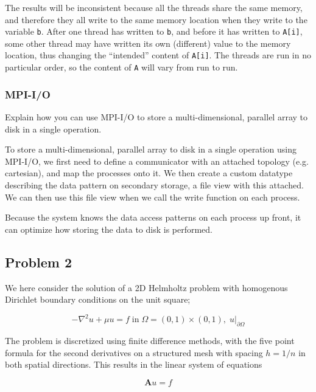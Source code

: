 The results will be inconsistent because all the threads share the same memory, and therefore they all write to the same memory location when they write to the variable \texttt{b}. After one thread has written to \texttt{b}, and before it has written to \texttt{A[i]}, some other thread may have written its own (different) value to the memory location, thus changing the ``intended'' content of \texttt{A[i]}. The threads are run in no particular order, so the content of \texttt{A}  will vary from run to run.

\subsubsection{MPI-I/O} %
\label{ssub:mpi_i_o}

\begin{question}
  Explain how you can use MPI-I/O to store a multi-dimensional, parallel array to disk in a single operation.
\end{question}

To store a multi-dimensional, parallel array to disk in a single operation using MPI-I/O, we first need to define a communicator with an attached topology (e.g. cartesian), and map the processes onto it. We then create a custom datatype describing the data pattern on secondary storage, a file view with this attached. We can then use this file view when we call the write function on each process.

Because the system knows the data access patterns on each process up front, it can optimize how storing the data to disk is performed.




\clearpage
\subsection{Problem 2} %
\label{sub:problem_2}

\begin{question}
  We here consider the solution of a 2D Helmholtz problem with homogenous Dirichlet boundary conditions on the unit square;

  \begin{equation}
    - \nabla^2 u + \mu u = f \; \text{in} \; \Omega = (0,1) \times (0,1), \; u\vert_{\partial \Omega}
  \end{equation}

  The problem is discretized using finite difference methods, with the five point formula for the second derivatives on a structured mesh with spacing $h=1/n$ in both spatial directions. This results in the linear system of equations

  \begin{equation}
    \mathbf{A}u=f
  \end{equation}
\end{question}

